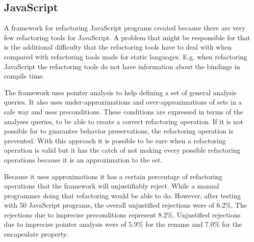 \subsection{JavaScript}

A framework \cite{feldthaus2011tool} for refactoring JavaScript programs created because there are very few refactoring tools for JavaScript. 
A problem that might be responsible for that is the additional difficulty that the refactoring tools have to deal with when compared with refactoring tools made for static languages. 
E.g. when refactoring JavaScript the refactoring tools do not have information about the bindings in compile time.



The framework uses pointer analysis to help defining a set of general analysis queries. 
It also uses under-approximations and over-approximations of sets in a safe way and uses preconditions.
These conditions are expressed in terms of the analyses queries, to be able to create a correct refactoring operation. 
If it is not possible for to guarantee behavior preservations, the refactoring operation is prevented.
With this approach it is possible to be sure when a refactoring operation is valid but it has the catch of not making every possible refactoring operations because it is an approximation to the set.



Because it uses approximations it has a certain percentage of refactoring operations that the framework will unjustifiably reject.
While a manual programmer doing that refactoring would be able to do. 
However, after testing with 50 JavaScript programs, the overall unjustified rejections were of 6.2\%. 
The rejections due to imprecise preconditions represent 8.2\%.
Unjustified rejections due to imprecise pointer analysis were of 5.9\% for the rename and 7.0\% for the encapsulate property. 
